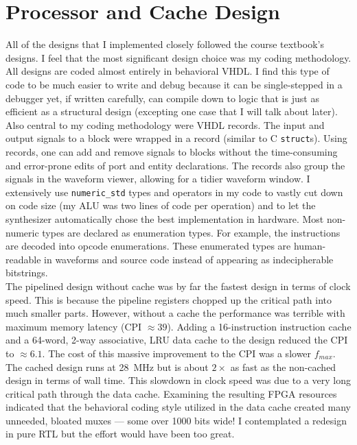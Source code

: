 \documentclass[12pt]{article}
\begin{document}
\newpage
\section{Processor and Cache Design}

All of the designs that I implemented closely followed the course textbook's designs. I feel that the most significant design choice was my coding methodology. All designs are coded almost entirely in behavioral VHDL. I find this type of code to be much easier to write and debug because it can be single-stepped in a debugger yet, if written carefully, can compile down to logic that is just as efficient as a structural design (excepting one case that I will talk about later). Also central to my coding methodology were VHDL records. The input and output signals to a block were wrapped in a record (similar to C \texttt{struct}s). Using records, one can add and remove signals to blocks without the time-consuming and error-prone edits of port and entity declarations. The records also group the signals in the waveform viewer, allowing for a tidier waveform window. I extensively use \texttt{numeric\_std} types and operators in my code to vastly cut down on code size (my ALU was two lines of code per operation) and to let the synthesizer automatically chose the best implementation in hardware. Most non-numeric types are declared as enumeration types. For example, the instructions are decoded into opcode enumerations. These enumerated types are human-readable in waveforms and source code instead of appearing as indecipherable bitstrings.\\

The pipelined design without cache was by far the fastest design in terms of clock speed. This is because the pipeline registers chopped up the critical path into much smaller parts. However, without a cache the performance was terrible with maximum memory latency (CPI $\approx 39$). Adding a 16-instruction instruction cache and a 64-word, 2-way associative, LRU data cache to the design reduced the CPI to $\approx 6.1$. The cost of this massive improvement to the CPI was a slower $f_{max}$. The cached design runs at 28~MHz but is about $2 \times$ as fast as the non-cached design in terms of wall time. This slowdown in clock speed was due to a very long critical path through the data cache. Examining the resulting FPGA resources indicated that the behavioral coding style utilized in the data cache created many unneeded, bloated muxes --- some over 1000 bits wide! I contemplated a redesign in pure RTL but the effort would have been too great.\\
\end{document}

